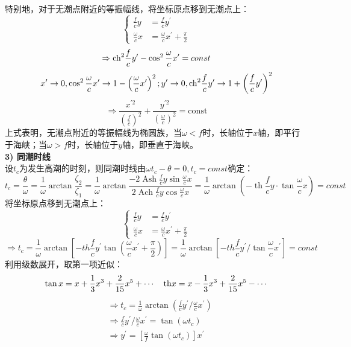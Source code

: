 \documentclass[a4paper,12pt]{article}
\begin{document}
	\indent
	特别地，对于无潮点附近的等振幅线，将坐标原点移到无潮点上：
	\[
	\left\{
	\begin{aligned}
	\frac{f}{c}y&=\frac{f}{c}y^{\prime} \\
	\frac{\omega}{c}x&=\frac{\omega}{c}x^{\prime}+\frac{\pi}{2}
	\end{aligned}
	\right.
	\]
	\[
	\Rightarrow{\rm ch}^{2} \frac{f}{c} y^{\prime}-\cos ^{2} \frac{\omega}{c} x^{\prime}=const
	\]
	\[
	x^{\prime}\rightarrow 0, \cos ^{2} \frac{\omega}{c} x^{\prime}\rightarrow 1-\left( \frac{\omega}{c}x^{\prime}\right)^2;y^{\prime}\rightarrow 0, {\rm ch} ^{2} \frac{f}{c} y^{\prime}\rightarrow 1+\left( \frac{f}{c}y^{\prime}\right)^2
	\]
	\[
	\Rightarrow \boxed{\frac{x^{\prime 2}}{\left(\frac{f}{c}\right)^{2}}+\frac{y^{\prime 2}}{\left(\frac{\omega}{c}\right)^{2}}=\mathrm{const}}
	\]
	\indent
    上式表明，无潮点附近的等振幅线为椭圆族，当$\omega<f$时，长轴位于$x$轴，即平行于海峡；当$\omega>f$时，长轴位于$y$轴，即垂直于海峡。\\
    \indent
    \textbf {3) 同潮时线}\\
    \indent
    设$t_c$为发生高潮的时刻，则同潮时线由$\omega t_c-\theta=0,t_c=const$确定：
    \[
    t_c=\frac{\theta}{\omega}=\frac{1}{\omega} \arctan \frac{\zeta_{2}}{\zeta_{1}}=\frac{1}{\omega} \arctan \frac{-2  \operatorname{Ash} \frac{f}{c} y \sin \frac{\omega}{c} x}{2 \operatorname{Ach} \frac{f}{c} y \cos \frac{\omega}{c} x}=\frac{1}{\omega} \arctan \left(-\operatorname{th} \frac{f}{c} y \cdot \tan \frac{\omega}{c} x\right)=const
    \]
    \indent
    将坐标原点移到无潮点上：
    \[
    \left\{
    \begin{aligned}
    \frac{f}{c}y&=\frac{f}{c}y^{\prime} \\
    \frac{\omega}{c}x&=\frac{\omega}{c}x^{\prime}+\frac{\pi}{2}     \end{aligned}
    \right.
    \]
    \[
    \Rightarrow t_{c}=\frac{1}{\omega} \arctan \left[-t h \frac{f}{c} y^{\prime} \tan \left(\frac{\omega}{c} x^{\prime}+\frac{\pi}{2}\right)\right]=\frac{1}{\omega} \arctan \left[-t h \frac{f}{c} y^{\prime} / \tan \frac{\omega}{c} x^{\prime}\right]=const
    \]
    \indent
    利用级数展开，取第一项近似：
    \[
     \tan x=x+\frac{1}{3} x^{3}+\frac{2}{15} x^{5}+\cdots \quad {\rm th} x=x-\frac{1}{3} x^{3}+\frac{2}{15} x^{5}-\cdots
    \]
	\[
	\begin{aligned}
	&\Rightarrow t_c=\frac{1}{\omega} \arctan \left( \frac{f}{c} y^{\prime} / \frac{\omega}{c} x^{\prime} \right) \\
	&\Rightarrow \frac{f}{c} y^{\prime} / \frac{\omega}{c} x^{\prime}=\tan (\omega t_c)\\
	&\Rightarrow \boxed{y^{\prime}=\left[\frac{\omega}{f} \tan \left(\omega t_{c}\right)\right] x^{\prime}}
	\end{aligned}
	\]
\end{document}
